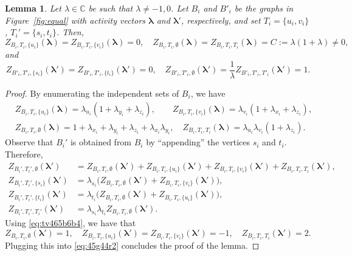 \documentclass[11pt]{article}
\newtheorem{lemma}[theorem]{Lemma}
\def\Complex{\mathbb{C}}
\def\lambdab{\ensuremath{\boldsymbol{\lambda}}}
\begin{document}
\begin{lemma}\label{lem:equalitygadget}
Let $\lambda\in \Complex$ be such that $\lambda\neq -1,0$.  Let $B_i$ and $B'_i$ be the graphs in Figure~\ref{fig:equal} with activity vectors $\lambdab$ and $\lambdab'$, respectively, and set $T_i=\{u_i,v_i\}$, $T_i'=\{s_i,t_i\}$. Then,
$$Z_{B_i,T_i,\{u_i\}}(\lambdab) = Z_{B_i,T_i,\{v_{i}\}}(\lambdab)=0, \quad Z_{B_i,T_i,\emptyset}(\lambdab) = Z_{B_i,T_i,T_i}(\lambdab)=C:=\lambda(1+\lambda)\neq 0,$$
and
$$ Z_{B'_i,T'_i,\{s_i\}}(\lambdab') = Z_{B'_i,T'_i,\{{t}_i\}}(\lambdab') =0, \quad Z_{B'_i,T'_i,\emptyset}(\lambdab') =\frac{1}{\lambda} Z_{B'_i,T'_i,T'_i}(\lambdab')=1.$$
\end{lemma}
\begin{proof}
By enumerating the independent sets of $B_i$, we have 
\begin{equation}\label{eq:tv465b6b4}
\begin{aligned}
&Z_{B_i,T_i,\{u_i\}}(\lambdab)=\lambda_{u_i}(1+\lambda_{y_i}+\lambda_{z_i}),\qquad   Z_{B_i,T_i,\{v_{i}\}}(\lambdab) = \lambda_{v_i}(1+\lambda_{x_i}+\lambda_{z_i}),\\
&Z_{B_i,T_i,\emptyset}(\lambdab) = 1+ \lambda_{x_i}+\lambda_{y_i}+\lambda_{z_i}+ \lambda_{x_i}\lambda_{y_i},\quad Z_{B_i,T_i,T_i}(\lambdab)=\lambda_{u_i}\lambda_{v_i}(1+\lambda_{z_i}).
\end{aligned} 
\end{equation}
Observe that $B_i'$ is obtained from $B_i$ by ``appending'' the vertices $s_i$ and $t_i$. Therefore,
\begin{equation}\label{eq:45g44r2}
\begin{aligned}
Z_{B_i',T_i',\emptyset}(\lambdab')& = Z_{B_i,T_i,\emptyset}(\lambdab')+Z_{B_i,T_i,\{u_i\}}(\lambdab')+Z_{B_i,T_i,\{v_i\}}(\lambdab')+Z_{B_i,T_i,T_i}(\lambdab'),\\
Z_{B_i',T_i',\{s_i\}}(\lambdab')&=\lambda_{s_i}\big(Z_{B_i,T_i,\emptyset}(\lambdab')+Z_{B_i,T_i,\{v_i\}}(\lambdab')\big),\\
Z_{B_i',T_i',\{t_{i}\}}(\lambdab')&= \lambda_{t_i}\big(Z_{B_i,T_i,\emptyset}(\lambdab')+Z_{B_i,T_i,\{u_i\}}(\lambdab')\big),\\
Z_{B_i',T_i',T_i'}(\lambdab')&=\lambda_{s_i}\lambda_{t_i}Z_{B_i,T_i,\emptyset}(\lambdab').
\end{aligned} 
\end{equation}
Using \eqref{eq:tv465b6b4}, we have that 
\[Z_{B_i,T_i,\emptyset}(\lambdab')=1,\quad Z_{B_i,T_i,\{u_i\}}(\lambdab')=Z_{B_i,T_i,\{v_i\}}(\lambdab')=-1, \quad Z_{B_i,T_i,T_i}(\lambdab')=2.\]
Plugging this into \eqref{eq:45g44r2} concludes the proof of the lemma.
\end{proof}
\end{document}
